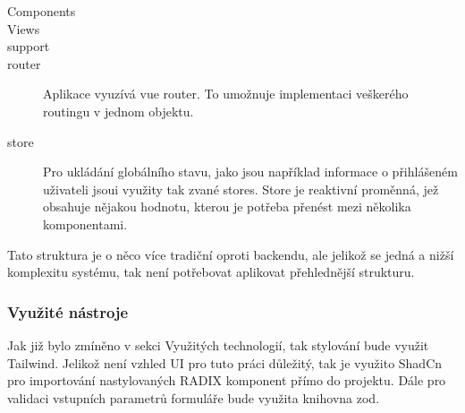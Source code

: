 \begin{description}
    \item[Components] 

    \item[Views]  

    \item[support] 

    \item[router] 
    Aplikace vyuzívá vue router. To umožnuje implementaci veškerého routingu v jednom objektu. 

    \item[store]
    Pro ukládání globálního stavu, jako jsou například informace o přihlášeném uživateli jsoui využity tak zvané stores. Store je reaktivní proměnná, jež obsahuje nějakou hodnotu, kterou je potřeba přenést mezi několika komponentami.
\end{description}

Tato struktura je o něco více tradiční oproti backendu, ale jelikož se jedná a nižší komplexitu systému, tak není potřebovat aplikovat přehlednější strukturu.

\subsubsection{Využité nástroje}
Jak již bylo zmíněno v sekci Využitých technologií, tak stylování bude využit Tailwind. Jelikož není vzhled UI pro tuto práci důležitý, tak je využito ShadCn pro importování nastylovaných RADIX komponent přímo do projektu. Dále pro validaci vstupních parametrů formuláře bude využita knihovna zod.


